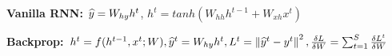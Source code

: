 \textbf{Vanilla RNN:} $\widehat{y} = W_{hy} h^t$, $h^t = tanh(W_{hh} h^{t-1} + W_{xh} x^t)$

\textbf{Backprop:} $h^t = f(h^{t-1}, x^t; W), 
\widehat{y}^t = W_{hy}h^t, 
L^t = \left\lVert \widehat{y}^t - y^t \right\rVert ^2,
\frac{\delta L}{\delta W} = \sum_{t=1}^S \frac{\delta L^t}{\delta W}$\\

